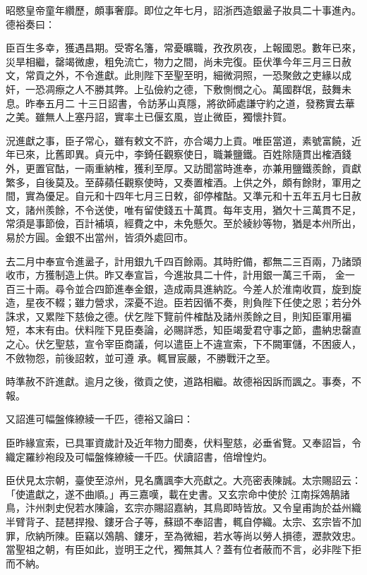 \begin{pinyinscope}
 昭愍皇帝童年纘歷，頗事奢靡。即位之年七月，詔浙西造銀盝子妝具二十事進內。德裕奏曰：



 臣百生多幸，獲遇昌期。受寄名籓，常憂曠職，孜孜夙夜，上報國恩。數年已來，災旱相繼，罄竭微慮，粗免流亡，物力之間，尚未完復。臣伏準今年三月三日赦文，常貢之外，不令進獻。此則陛下至聖至明，細微洞照，一恐聚斂之吏緣以成奸，一恐凋瘵之人不勝其弊。上弘儉約之德，下敷惻憫之心。萬國群氓，鼓舞未息。昨奉五月二
 十三日詔書，令訪茅山真隱，將欲師處謙守約之道，發務實去華之美。雖無人上塞丹詔，實率土已偃玄風，豈止微臣，獨懷抃賀。



 況進獻之事，臣子常心，雖有敕文不許，亦合竭力上貢。唯臣當道，素號富饒，近年已來，比舊即異。貞元中，李錡任觀察使日，職兼鹽鐵。百姓除隨貫出榷酒錢外，更置官酤，一兩重納榷，獲利至厚。又訪聞當時進奉，亦兼用鹽鐵羨餘，貢獻繁多，自後莫及。至薛蘋任觀察使時，又奏置榷酒。上供之外，頗有餘財，軍用之
 間，實為優足。自元和十四年七月三日敕，卻停榷酤。又準元和十五年五月七日赦文，諸州羨餘，不令送使，唯有留使錢五十萬貫。每年支用，猶欠十三萬貫不足，常須是事節儉，百計補填，經費之中，未免懸欠。至於綾紗等物，猶是本州所出，易於方圓。金銀不出當州，皆須外處回市。



 去二月中奉宣令進盝子，計用銀九千四百餘兩。其時貯備，都無二三百兩，乃諸頭收市，方獲制造上供。昨又奉宣旨，今進妝具二十件，計用銀一萬三千兩，
 金一百三十兩。尋令並合四節進奉金銀，造成兩具進納訖。今差人於淮南收買，旋到旋造，星夜不輟；雖力營求，深憂不迨。臣若因循不奏，則負陛下任使之恩；若分外誅求，又累陛下慈儉之德。伏乞陛下覽前件榷酤及諸州羨餘之目，則知臣軍用褊短，本末有由。伏料陛下見臣奏論，必賜詳悉，知臣竭愛君守事之節，盡納忠罄直之心。伏乞聖慈，宣令宰臣商議，何以遣臣上不違宣索，下不闕軍儲，不困疲人，不斂物怨，前後詔敕，並可遵
 承。輒冒宸嚴，不勝戰汗之至。



 時準赦不許進獻。逾月之後，徵貢之使，道路相繼。故德裕因訴而諷之。事奏，不報。



 又詔進可幅盤條繚綾一千匹，德裕又論曰：



 臣昨緣宣索，已具軍資歲計及近年物力聞奏，伏料聖慈，必垂省覽。又奉詔旨，令織定羅紗袍段及可幅盤條繚綾一千匹。伏讀詔書，倍增惶灼。



 臣伏見太宗朝，臺使至涼州，見名鷹諷李大亮獻之。大亮密表陳誠。太宗賜詔云：「使遣獻之，遂不曲順。」再三嘉嘆，載在史書。又玄宗命中使於
 江南採鵁鶄諸鳥，汴州刺史倪若水陳論，玄宗亦賜詔嘉納，其鳥即時皆放。又令皇甫詢於益州織半臂背子、琵琶捍撥、鏤牙合子等，蘇頲不奉詔書，輒自停織。太宗、玄宗皆不加罪，欣納所陳。臣竊以鵁鶄、鏤牙，至為微細，若水等尚以勞人損德，瀝款效忠。當聖祖之朝，有臣如此，豈明王之代，獨無其人？蓋有位者蔽而不言，必非陛下拒而不納。




\end{pinyinscope}
